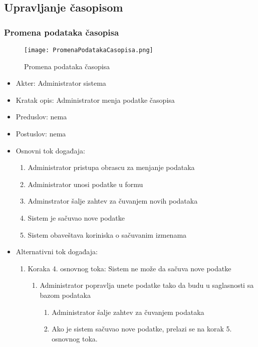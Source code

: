 \documentclass[a4paper]{article}
\begin{document}
\subsection{Upravljanje časopisom}

\subsubsection{Promena podataka časopisa}

\begin{figure}[hbt!]
    \centering
    \texttt{[image: PromenaPodatakaCasopisa.png]}
    \caption{Promena podataka časopisa}
    \label{fig:my_label}
\end{figure}

\begin{itemize}
    \item Akter: Administrator sistema
    \item Kratak opis: Administrator menja podatke časopisa
    \item Preduslov: nema
    \item Postuslov: nema
    \item Osnovni tok događaja:
        \begin{enumerate}
            \item Administrator pristupa obrascu za menjanje podataka
            \item Administrator unosi podatke u formu
            \item Adminstrator šalje zahtev za čuvanjem novih podataka
            \item Sistem je sačuvao nove podatke
            \item Sistem obaveštava koriniska o sačuvanim izmenama
        \end{enumerate}
    \item Alternativni tok događaja:
        \begin{enumerate}
            \item Koraka 4. osnovnog toka: Sistem ne može da sačuva nove podatke
                \begin{enumerate}
                    \item Administrator popravlja unete podatke tako da budu u saglasnosti sa bazom podataka
                    \begin{enumerate}
                        \item Administrator šalje zahtev za čuvanjem podataka
                        \item Ako je sistem sačuvao nove podatke, prelazi se na korak 5. osnovnog toka.

\end{enumerate}
\end{enumerate}
\end{enumerate}
\end{itemize}
\end{document}
